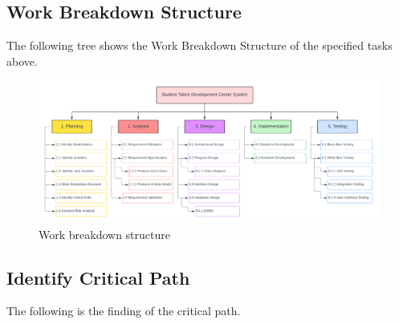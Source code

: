 \subsection{Work Breakdown Structure}
\begin{justify}
The following tree shows the Work Breakdown Structure of the specified tasks above.
\end{justify}

\begin{figure}[H]
    \centerline{\includegraphics[width=150mm,scale=1]{figures/analysis_and_design/planning/WBS V2.png}}
    \caption{Work breakdown structure}
    \label{WBS}
\end{figure}


\subsection{Identify Critical Path}
\begin{justify}
The following is the finding of the critical path.
\end{justify}

